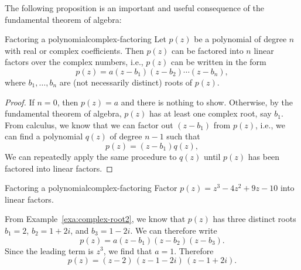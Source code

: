 The following proposition is an important and useful consequence of
the fundamental theorem of algebra:

\begin{proposition}{Factoring a polynomial}{complex-factoring}
  Let $p(z)$ be a polynomial of degree $n$ with real or complex
  coefficients. Then $p(z)$ can be factored into $n$ linear factors
  over the complex numbers, i.e., $p(z)$ can be written in the form
  \begin{equation*}
    p(z) = a(z-b_1)(z-b_2)\cdots(z-b_n),
  \end{equation*}
  where $b_1,\ldots,b_n$ are (not necessarily distinct) roots of
  $p(z)$.
\end{proposition}

\begin{proof}
  If $n=0$, then $p(z)=a$ and there is nothing to show. Otherwise, by
  the fundamental theorem of algebra, $p(z)$ has at least one complex
  root, say $b_1$. From calculus, we know that we can factor out
  $(z-b_1)$ from $p(z)$, i.e., we can find a polynomial $q(z)$ of
  degree $n-1$ such that
  \begin{equation*}
    p(z) = (z-b_1) q(z),
  \end{equation*}
  We can repeatedly apply the same procedure to $q(z)$ until $p(z)$
  has been factored into linear factors.
\end{proof}

\begin{example}{Factoring a polynomial}{complex-factoring}
  Factor $p(z) = z^3 - 4z^2 + 9z - 10$ into linear factors.
\end{example}

\begin{solution}
  From Example~\ref{exa:complex-root2}, we know that $p(z)$ has three
  distinct roots $b_1=2$, $b_2=1+2i$, and $b_3=1-2i$. We can therefore
  write
  \begin{equation*}
    p(z) = a(z-b_1)(z-b_2)(z-b_3).
  \end{equation*}
  Since the leading term is $z^3$, we find that $a=1$. Therefore
  \begin{equation*}
    p(z) = (z-2)\,(z-1-2i)\,(z-1+2i).
  \end{equation*}
  \vspace{-2ex}
\end{solution}
